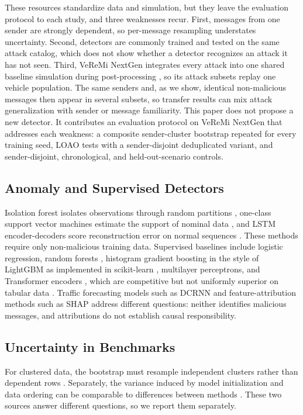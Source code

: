 \documentclass[preprint,12pt,numafflabel]{elsarticle}
\begin{document}
These resources standardize data and simulation, but they leave the evaluation protocol to each study, and three weaknesses recur. First, messages from one sender are strongly dependent, so per-message resampling understates uncertainty. Second, detectors are commonly trained and tested on the same attack catalog, which does not show whether a detector recognizes an attack it has not seen. Third, VeReMi NextGen integrates every attack into one shared baseline simulation during post-processing \cite{hermann2026veremi}, so its attack subsets replay one vehicle population. The same senders and, as we show, identical non-malicious messages then appear in several subsets, so transfer results can mix attack generalization with sender or message familiarity. This paper does not propose a new detector. It contributes an evaluation protocol on VeReMi NextGen that addresses each weakness: a composite sender-cluster bootstrap repeated for every training seed, LOAO tests with a sender-disjoint deduplicated variant, and sender-disjoint, chronological, and held-out-scenario controls.

\subsection{Anomaly and Supervised Detectors}
Isolation forest isolates observations through random partitions \cite{liu2008isolation}, one-class support vector machines estimate the support of nominal data \cite{scholkopf2001estimating}, and LSTM encoder-decoders score reconstruction error on normal sequences \cite{malhotra2016lstm}. These methods require only non-malicious training data. Supervised baselines include logistic regression, random forests \cite{breiman2001random}, histogram gradient boosting in the style of LightGBM \cite{ke2017lightgbm} as implemented in scikit-learn \cite{pedregosa2011scikit}, multilayer perceptrons, and Transformer encoders \cite{vaswani2017attention}, which are competitive but not uniformly superior on tabular data \cite{gorishniy2021revisiting}. Traffic forecasting models such as DCRNN \cite{li2018dcrnn} and feature-attribution methods such as SHAP \cite{lundberg2017shap} address different questions: neither identifies malicious messages, and attributions do not establish causal responsibility.

\subsection{Uncertainty in Benchmarks}
For clustered data, the bootstrap must resample independent clusters rather than dependent rows \cite{efron1993introduction,field2007bootstrapping}. Separately, the variance induced by model initialization and data ordering can be comparable to differences between methods \cite{bouthillier2021accounting}. These two sources answer different questions, so we report them separately.
\end{document}
